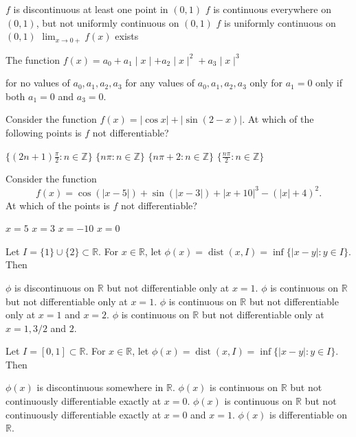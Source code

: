 \documentclass[10pt]{exam}
\DeclareMathOperator{\dist}{\text{dist}}
\begin{document}
\begin{questions}
\begin{checkboxes}
\choice $f$ is discontinuous at least one point in $(0,1)$
\choice $f$ is continuous everywhere on  $(0,1)$, but not uniformly continuous on $(0,1)$
\choice $f$ is uniformly continuous on $(0,1)$
\choice $\lim_{x\rightarrow 0+} f(x)$ exists
\end{checkboxes}

\question 
The function $f(x)=a_0+a_1\mid x \mid + a_2\mid x \mid^2 +a_3\mid x \mid^3$

\begin{choices}
\choice for no values of $a_0,a_1,a_2,a_3$
\choice for any values of $a_0,a_1,a_2,a_3$
\choice only for $a_1=0$
\choice only if both $a_1=0$ and $a_3=0$.  
\end{choices}


\question
Consider the function $f(x)=| \cos x |+|\sin(2-x)|$. At which of the following points is $f$ not differentiable?

\begin{checkboxes}
\choice $\{(2n+1)\frac{ \pi}{2}:n \in \mathbb{Z}\}$
\choice $\{n \pi:n \in \mathbb{Z}\}$
\choice $\{n \pi+2:n \in \mathbb{Z}\}$
\choice $\{\frac{ n \pi}{2}:n \in \mathbb{Z}\}$
\end{checkboxes}

\question
Consider the function 
$$f(x)= \cos(|x-5|)+\sin(|x-3|)+|x+10|^3 - (|x|+4)^2.$$
At which of the points is $f$ not differentiable?

\begin{oneparcheckboxes}
\choice $x=5$
\choice $x=3$
\choice $x=-10$
\choice $x=0$
\end{oneparcheckboxes}

\question
Let $I=\{1\} \cup \{2\} \subset \mathbb{R}$. For $x \in \mathbb{R}$, let $\phi(x)=\dist(x,I)=\inf \{|x-y|:y \in I\}$. Then

\begin{choices}
\choice $\phi$ is discontinuous on $\mathbb{R}$ but not differentiable only at $x=1$.
\choice $\phi$ is continuous on $\mathbb{R}$ but not differentiable only at $x=1$.
\choice $\phi$ is continuous on $\mathbb{R}$ but not differentiable only at $x=1$ and $x=2$.
\choice $\phi$ is continuous on $\mathbb{R}$ but not differentiable only at $x=1,3/2$ and $2$.  
\end{choices}

\question
Let $I=[0,1] \subset \mathbb{R}$. For $x \in \mathbb{R}$, let $\phi(x)=\dist(x,I)=\inf \{|x-y|:y \in I\}$. Then

\begin{choices}
\choice $\phi(x)$ is discontinuous somewhere in $\mathbb{R}$.
\choice $\phi(x)$ is continuous on $\mathbb{R}$ but not continuously differentiable exactly at $x=0$.
\choice $\phi(x)$ is continuous on $\mathbb{R}$ but not continuously differentiable exactly at $x=0$ and $x=1$.
\choice $\phi(x)$ is differentiable on $\mathbb{R}$.  
\end{choices}



\end{questions}
\end{document}
